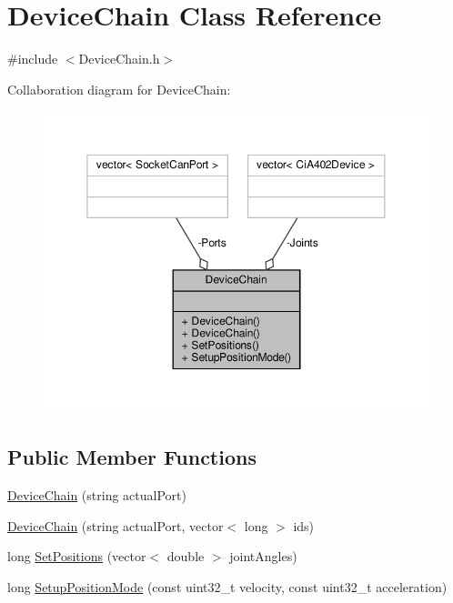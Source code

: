 \hypertarget{classDeviceChain}{}\section{Device\+Chain Class Reference}
\label{classDeviceChain}


{\ttfamily \#include $<$Device\+Chain.\+h$>$}



Collaboration diagram for Device\+Chain\+:\nopagebreak
\begin{figure}[H]
\begin{center}
\leavevmode
\includegraphics[width=350pt]{classDeviceChain__coll__graph}
\end{center}
\end{figure}
\subsection*{Public Member Functions}
\begin{DoxyCompactItemize}
\item 
\hyperlink{classDeviceChain_ad89af127eec501ad00ad5f5de197b21e}{Device\+Chain} (string actual\+Port)
\item 
\hyperlink{classDeviceChain_a20dd5853f160cfc8ef21ed93dac96f11}{Device\+Chain} (string actual\+Port, vector$<$ long $>$ ids)
\item 
long \hyperlink{classDeviceChain_ae6e9be5bfb46721d4c6b66d3d9541f25}{Set\+Positions} (vector$<$ double $>$ joint\+Angles)
\item 
long \hyperlink{classDeviceChain_a329b622f12a419f01a9bab38f869144b}{Setup\+Position\+Mode} (const uint32\+\_\+t velocity, const uint32\+\_\+t acceleration)
\end{DoxyCompactItemize}
